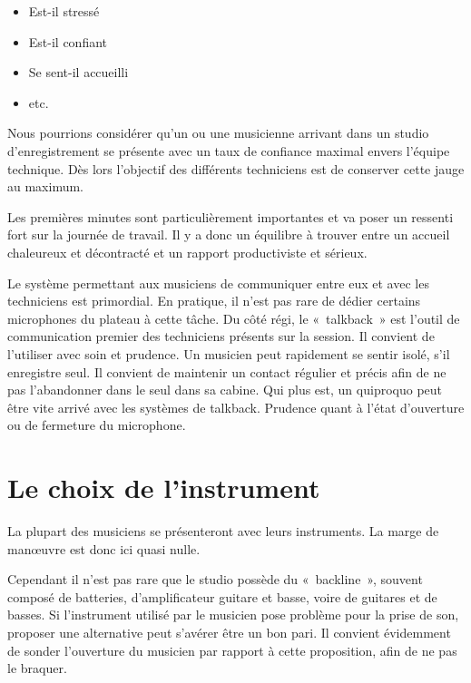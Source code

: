 \documentclass[
]{book}
\providecommand{\tightlist}{%
  \setlength{\itemsep}{0pt}\setlength{\parskip}{0pt}}
\begin{document}
\begin{itemize}
\tightlist
\item
  Est-il stressé
\item
  Est-il confiant
\item
  Se sent-il accueilli
\item
  etc.
\end{itemize}

Nous pourrions considérer qu'un ou une musicienne arrivant dans un studio d'enregistrement se présente avec un taux de confiance maximal envers l'équipe technique. Dès lors l'objectif des différents techniciens est de conserver cette jauge au maximum.

Les premières minutes sont particulièrement importantes et va poser un ressenti fort sur la journée de travail. Il y a donc un équilibre à trouver entre un accueil chaleureux et décontracté et un rapport productiviste et sérieux.

Le système permettant aux musiciens de communiquer entre eux et avec les techniciens est primordial. En pratique, il n'est pas rare de dédier certains microphones du plateau à cette tâche. Du côté régi, le «~talkback~» est l'outil de communication premier des techniciens présents sur la session. Il convient de l'utiliser avec soin et prudence. Un musicien peut rapidement se sentir isolé, s'il enregistre seul. Il convient de maintenir un contact régulier et précis afin de ne pas l'abandonner dans le seul dans sa cabine. Qui plus est, un quiproquo peut être vite arrivé avec les systèmes de talkback. Prudence quant à l'état d'ouverture ou de fermeture du microphone.

\hypertarget{le-choix-de-linstrument}{%
\section{Le choix de l'instrument}\label{le-choix-de-linstrument}}

La plupart des musiciens se présenteront avec leurs instruments. La marge de manœuvre est donc ici quasi nulle.

Cependant il n'est pas rare que le studio possède du «~backline~», souvent composé de batteries, d'amplificateur guitare et basse, voire de guitares et de basses. Si l'instrument utilisé par le musicien pose problème pour la prise de son, proposer une alternative peut s'avérer être un bon pari. Il convient évidemment de sonder l'ouverture du musicien par rapport à cette proposition, afin de ne pas le braquer.
\end{document}
